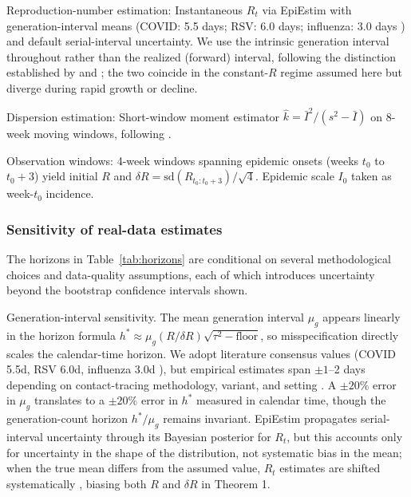 \documentclass[review]{elsarticle}
\theoremstyle{plain}
\theoremstyle{definition}
\begin{document}
Reproduction-number estimation: Instantaneous $R_t$ via EpiEstim \citep{cori2013framework, thompson2019epiestim} with generation-interval means (COVID: 5.5 days; RSV: 6.0 days; influenza: 3.0 days \citep{nishiura2009generation, park2020forward, hakki2022serial}) and default serial-interval uncertainty. We use the intrinsic generation interval throughout rather than the realized (forward) interval, following the distinction established by \citet{svensson2007generation} and \citet{champredon2015intrinsic}; the two coincide in the constant-$R$ regime assumed here but diverge during rapid growth or decline.

Dispersion estimation: Short-window moment estimator $\hat{k} = \bar{I}^2 / (s^2 - \bar{I})$ on 8-week moving windows, following \citet{endo2020overdispersion, adam2020clustering}.

Observation windows: 4-week windows spanning epidemic onsets (weeks $t_0$ to $t_0+3$) yield initial $R$ and $\delta R = \text{sd}(R_{t_0:t_0+3})/\sqrt{4}$. Epidemic scale $I_0$ taken as week-$t_0$ incidence.

\subsubsection{Sensitivity of real-data estimates}

The horizons in Table~\ref{tab:horizons} are conditional on several methodological choices and data-quality assumptions, each of which introduces uncertainty beyond the bootstrap confidence intervals shown.

Generation-interval sensitivity. The mean generation interval $\mu_g$ appears linearly in the horizon formula $h^* \approx \mu_g (R/\delta R)\sqrt{\tau^2 - \text{floor}}$, so misspecification directly scales the calendar-time horizon. We adopt literature consensus values (COVID 5.5d, RSV 6.0d, influenza 3.0d \citep{nishiura2009generation, park2020forward, hakki2022serial}), but empirical estimates span $\pm 1$--2 days depending on contact-tracing methodology, variant, and setting \citep{farrow2017information, perofsky2017forecasting}. A $\pm 20\%$ error in $\mu_g$ translates to a $\pm 20\%$ error in $h^*$ measured in calendar time, though the generation-count horizon $h^* / \mu_g$ remains invariant. EpiEstim propagates serial-interval uncertainty through its Bayesian posterior for $R_t$, but this accounts only for uncertainty in the shape of the distribution, not systematic bias in the mean; when the true mean differs from the assumed value, $R_t$ estimates are shifted systematically \citep{wallinga2007generation}, biasing both $R$ and $\delta R$ in Theorem 1.
\end{document}

